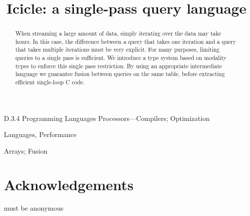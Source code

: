 \documentclass[preprint]{sigplanconf}
\begin{document}
\doi{}

\title{Icicle: a single-pass query language}


\maketitle
\makeatactive

\begin{abstract}
When streaming a large amount of data, simply iterating over the data may take hours.
In this case, the difference between a query that takes one iteration and a query that takes multiple iterations must be very explicit.
For many purposes, limiting queries to a single pass is sufficient.
We introduce a type system based on modality types to enforce this single pass restriction.
By using an appropriate intermediate language we guarantee fusion between queries on the same table, before extracting efficient single-loop C code.
\end{abstract}


\category
	{D.3.4}
	{Programming Languages}
	{Processors---Compilers; Optimization}

\terms
	Languages, Performance

\keywords
	Arrays; Fusion











\section*{Acknowledgements}
must be anonymous



\end{document}
